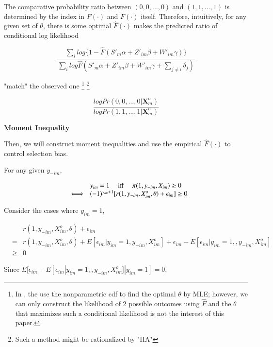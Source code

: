 \documentclass[a4paper]{article}
\begin{document}
The comparative probability ratio between $(0,0,...,0)$ and $(1, 1, ..., 1)$ is determined by the index in $F(\cdot)$ and $F(\cdot)$ itself. Therefore, intuitively, for any given set of $\theta$, there is some optimal $\hat{F}(\cdot)$ makes the predicted ratio of conditional log likelihood 

$$\dfrac{\sum_i log \{1 - \hat{F}(S'_m\alpha+Z'_{im}\beta+W'_{im}\gamma)\}}{\sum_i log \hat{F}(S'_m\alpha+Z'_{im}\beta+W'_{im}\gamma + \sum_{j\neq i}\delta_{j})}$$

"match" the observed one \footnote{In \cite{cosslett1983distribution}, the use the nonparametric cdf to find the optimal $\theta$ by MLE; however, we can only construct the likelihood of 2 possible outcomes using $\hat{F}$ and the $\theta$ that maximizes such a conditional likelihood is not the interest of this paper.}
\footnote{Such a method might be rationalized by "IIA"}

$$\dfrac{log Pr(0,0,...,0|\textbf{X}^o_m) }{log Pr(1,1,...,1|\textbf{X}^o_m)}$$




\bigskip

\textbf{Moment Inequality}

\bigskip

Then, we will construct moment inequalities and use the empirical $\hat{F}(\cdot)$ to control selection bias.

\bigskip

For any given $y_{-im}$,

$$
\begin{array}{rcl}
&&y_{im}=1 \mbox{ \quad iff \quad }  \pi(1,y_{-im},X_{im}) \geq 0 \\
&\Longleftrightarrow&  (-1)^{y_{im}+1}[r(1,y_{-im},X^o_{im},\theta)+ \epsilon_{im}]\geq 0 \\
\end{array}
$$

Consider the cases where $y_{im}=1$,

$$
\begin{array}{rcl}
&& r(1,y_{-im},X^o_{im},\theta)+ \epsilon_{im} \\
&=& r(1,y_{-im},X^o_{im},\theta)+ E[\epsilon_{im}|y_{im} = 1, y_{-im}, X^o_{im}] + \epsilon_{im} - E[\epsilon_{im}|y_{im} = 1, , y_{-im}, X^o_{im}]\\
&\geq& 0
\end{array}
$$


Since $ E[\epsilon_{im} - E[\epsilon_{im}|y_{im} = 1, , y_{-im}, X^o_{im}]|y_{im} = 1] = 0$,
\end{document}
